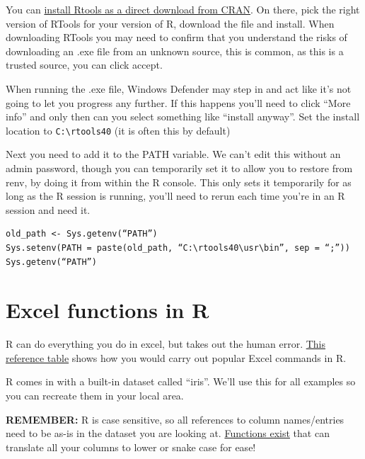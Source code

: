 \documentclass[
  12pt,
]{article}
\begin{document}
You can \href{https://cran.r-project.org/bin/windows/Rtools/}{install
Rtools as a direct download from CRAN}. On there, pick the right version
of RTools for your version of R, download the file and install. When
downloading RTools you may need to confirm that you understand the risks
of downloading an .exe file from an unknown source, this is common, as
this is a trusted source, you can click accept.

When running the .exe file, Windows Defender may step in and act like
it's not going to let you progress any further. If this happens you'll
need to click ``More info'' and only then can you select something like
``install anyway''. Set the install location to
\texttt{C:\textbackslash{}rtools40} (it is often this by default)

Next you need to add it to the PATH variable. We can't edit this without
an admin password, though you can temporarily set it to allow you to
restore from renv, by doing it from within the R console. This only sets
it temporarily for as long as the R session is running, you'll need to
rerun each time you're in an R session and need it.

\begin{verbatim}
old_path <- Sys.getenv(“PATH”) 
Sys.setenv(PATH = paste(old_path, “C:\rtools40\usr\bin”, sep = “;”)) 
Sys.getenv(“PATH”)
\end{verbatim}

\newpage

\hypertarget{excel-functions-in-r}{%
\section{Excel functions in R}\label{excel-functions-in-r}}

R can do everything you do in excel, but takes out the human error.
\href{https://rsconnect/rsc/stats-production-guidance/r.html\#Excel_functions_in_R}{This
reference table} shows how you would carry out popular Excel commands in
R.

R comes in with a built-in dataset called ``iris''. We'll use this for
all examples so you can recreate them in your local area.

\textbf{REMEMBER:} R is case sensitive, so all references to column
names/entries need to be as-is in the dataset you are looking at.
\href{https://www.rdocumentation.org/packages/janitor/versions/1.2.0/topics/clean_names}{Functions
exist} that can translate all your columns to lower or snake case for
ease!
\end{document}
